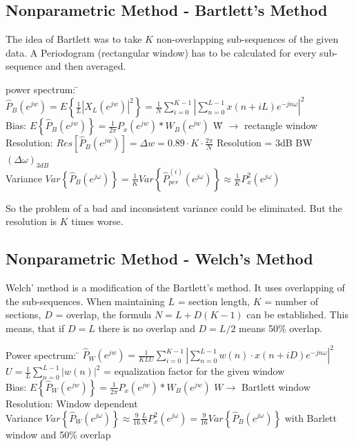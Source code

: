  
 
\subsection{Nonparametric Method - Bartlett's Method }
The idea of Bartlett was to take $K$ non-overlapping sub-sequences of the given data. 
A Periodogram (rectangular window) has to be calculated for every sub-sequence and then averaged.

\begin{tabbing}
power spectrum:  	\=  $\hat{P}_{B}(e^{jw}) = E\left\{\frac{1}{L}  \left|X_L(e^{jw})\right| ^2\right\} =  \frac{1}{N}\sum\limits_{i=0}^{K-1} \left|\sum\limits_{n=0}^{L-1} x(n+iL)e^{-jn\omega}\right| ^2$   \\
Bias: 				\>  $E\left\{ \hat{P}_{B}(e^{jw}) \right\} = \frac{1}{2 \pi}P_x(e^{jw})*W_B(e^{jw})$  \hspace{4cm} \= W $\to$ rectangle window\\
Resolution: 		\>  $Res\left[\hat{P}_{B}(e^{jw})\right] = \Delta w = 0.89 \cdot K \cdot \frac{2 \pi}{N}$\> Resolution = 3dB BW $(\Delta\omega)_{3dB}$\\
Variance 			\> $Var\left\lbrace\hat{P}_{B}(e^{j\omega})\right\rbrace = \frac{1}{K} Var\left\lbrace \hat{P}_{per}^{(i)}(e^{j\omega}) \right\rbrace \approx \frac{1}{K}P^2_x(e^{j\omega})$\\
\end{tabbing}
So the problem of a bad and inconsistent variance could be eliminated. But the resolution is $K$ times worse.

\subsection{Nonparametric Method - Welch's Method }
Welch' method is a modification of the Bartlett's method. It uses overlapping of the sub-sequences.
When maintaining $L$ = section length, $K$ = number of sections, $D$ = overlap, the formula 
$\boxed{N=L+D(K-1)}$ can be established. This means, that if $D=L$ there is no overlap and $D=L/2$ means 50\% overlap.

\begin{tabbing}
Power spectrum:  	\=  $\hat{P}_{W}(e^{jw}) =  \frac{1}{KLU}\sum\limits_{i=0}^{K-1} \left|\sum\limits_{n=0}^{L-1} w(n) \cdot x(n+iD)e^{-jn\omega}\right| ^2$   \\
\>						$U = \frac 1L \sum\limits_{n=0}^{L-1}|w(n)|^2$ = equalization factor for the given window\\
Bias: 				\>  $E\left\lbrace \hat{P}_{W}(e^{jw}) \right\rbrace = \frac{1}{2 \pi}P_x(e^{jw})*W_B(e^{jw})$ \quad $W \to$ Bartlett window\\
Resolution: 		\>  Window dependent\\
Variance 			\> $Var\left\lbrace\hat{P}_{W}(e^{j\omega})\right\rbrace \approx \frac{9}{16} \frac{L}{N}P^2_x(e^{j\omega}) = 
\frac{9}{16} Var\left\lbrace\hat{P}_{B}(e^{j\omega})\right\rbrace$ \qquad with Barlett window and 50\% overlap\\
\end{tabbing}


